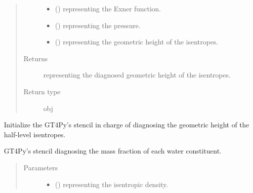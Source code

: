 \documentclass[letterpaper,10pt,english]{sphinxmanual}
\begin{document}
\begin{fulllineitems}
\begin{fulllineitems}
\begin{quote}
\begin{description}
\begin{itemize}
\item {} 
 () \textendash{}  representing the Exner function.

\item {} 
 () \textendash{}  representing the pressure.

\item {} 
 () \textendash{}  representing the geometric height of the isentropes.

\end{itemize}

\item[{Returns}] \leavevmode
{} representing the diagnosed geometric height of the isentropes.

\item[{Return type}] \leavevmode
obj

\end{description}\end{quote}

\end{fulllineitems}


\begin{fulllineitems}
\label{\detokenize{api:dycore.diagnostic_isentropic.DiagnosticIsentropic._stencil_diagnosing_height_initialize}}
Initialize the GT4Py’s stencil in charge of diagnosing the geometric height of the half-level isentropes.

\end{fulllineitems}


\begin{fulllineitems}
\label{\detokenize{api:dycore.diagnostic_isentropic.DiagnosticIsentropic._stencil_diagnosing_mass_fraction_of_water_constituents_in_air_defs}}
GT4Py’s stencil diagnosing the mass fraction of each water constituent.
\begin{quote}\begin{description}
\item[{Parameters}] \leavevmode\begin{itemize}
\item {} 
 () \textendash{}  representing the isentropic density.


\end{itemize}
\end{description}
\end{quote}
\end{fulllineitems}
\end{fulllineitems}
\end{document}
